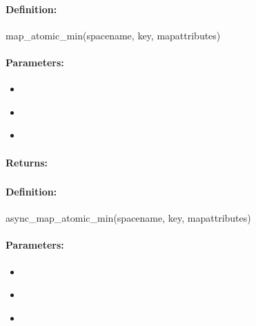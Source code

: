 \paragraph{Definition:}
\begin{rubycode}
map_atomic_min(spacename, key, mapattributes)
\end{rubycode}

\paragraph{Parameters:}
\begin{itemize}[noitemsep]
\item {}\\

\item {}\\

\item {}\\

\end{itemize}

\paragraph{Returns:}


\pagebreak
\subsubsection{}
\label{api:ruby:async_map_atomic_min}


\paragraph{Definition:}
\begin{rubycode}
async_map_atomic_min(spacename, key, mapattributes)
\end{rubycode}

\paragraph{Parameters:}
\begin{itemize}[noitemsep]
\item {}\\

\item {}\\

\item {}\\

\end{itemize}


